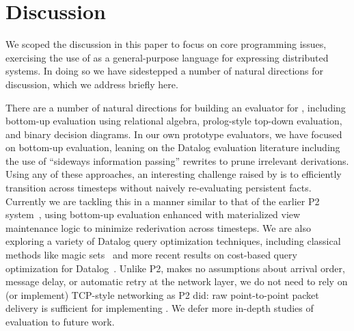 \section{Discussion}
We scoped the discussion in this paper to focus on core programming issues, exercising the use of \lang as a general-purpose language for expressing distributed systems.  In doing so we have sidestepped a number of natural directions for discussion, which we address briefly here.
    
There are a number of natural directions for building an evaluator for \lang, including bottom-up evaluation using relational algebra, prolog-style top-down evaluation, and binary decision diagrams.  In our own prototype evaluators, we have focused on bottom-up evaluation, leaning on the Datalog evaluation literature including the use of ``sideways information passing'' rewrites to prune irrelevant derivations.  Using any of these approaches, an interesting challenge raised by \lang is to efficiently transition across timesteps without naively re-evaluating persistent facts.  Currently we are tackling this in a manner similar to that of the earlier P2 system~\cite{p2}, using bottom-up evaluation enhanced with materialized view maintenance logic to minimize rederivation across timesteps. We are also exploring a variety of Datalog query optimization techniques, including classical methods like magic sets~\cite{ullmanbook} and more recent results on cost-based query optimization for Datalog~\cite{demoor}.  Unlike P2, \lang makes no assumptions about arrival order, message delay, or automatic retry at the network layer, we do not need to rely on (or implement) TCP-style networking as P2 did: raw point-to-point packet delivery is sufficient for implementing \lang.  We defer more in-depth studies of \lang evaluation to future work.


